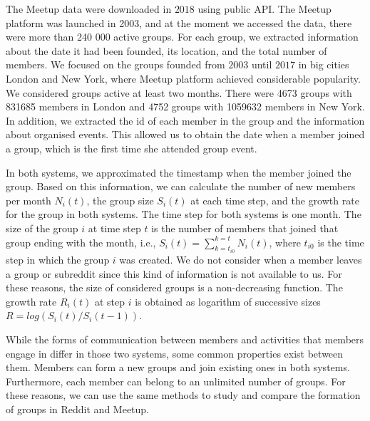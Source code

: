 
The Meetup data were downloaded in $2018$ using public API. The Meetup platform was launched in 2003, and at the moment we accessed the data, there were more than 240 000 active groups. For each group, we extracted information about the date it had been founded, its location, and the total number of members. We focused on the groups founded from $2003$ until $2017$ in big cities London and New York, where Meetup platform achieved considerable popularity. We considered groups active at least two months. There were 4673 groups with 831685 members in London and 4752 groups with 1059632 members in New York. In addition, we extracted the id of each member in the group and the information about organised events. This allowed us to obtain the date when a member joined a group, which is the first time she attended group event. 

In both systems, we approximated the timestamp when the member joined the group. Based on this information, we can calculate the number of new members per month $N_{i}(t)$, the group size $S_{i}(t)$ at each time step, and the growth rate for the group in both systems. The time step for both systems is one month. The size of the group $i$ at time step $t$ is the number of members that joined that group ending with the month, i.e., $S_{i}(t)=\sum^{k=t}_{k=t_{i0}}N_{i}(t)$, where $t_{i0}$ is the time step in which the group $i$ was created. We do not consider when a member leaves a group or subreddit since this kind of information is not available to us. For these reasons, the size of considered groups is a non-decreasing function. The growth rate $R_i(t)$ at step $i$ is obtained as logarithm of successive sizes $R = log(S_{i}(t)/S_{i}(t-1))$. 

While the forms of communication between members and activities that members engage in differ in those two systems, some common properties exist between them. Members can form a new groups and join existing ones in both systems. Furthermore, each member can belong to an unlimited number of groups. For these reasons, we can use the same methods to study and compare the formation of groups in Reddit and Meetup. 



